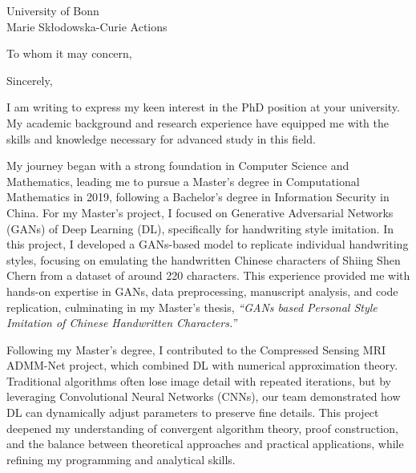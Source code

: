 \documentclass[11pt,a4paper, final]{moderncv}
\newcommand{\spacesubsection}{\vspace{0.2cm}}
\begin{document}
% 
\renewcommand{\refname}{\textbf{Publications}} 
{University of Bonn \\
Marie Skłodowska-Curie Actions}
\date{\today}
\opening{To whom it may concern,}
\closing{Sincerely,}
\makelettertitle
\thispagestyle{empty}
\pagestyle{empty}
I am writing to express my keen interest in the PhD position at your university. 
My academic background and research experience have equipped me with the skills and knowledge 
necessary for advanced study in this field. 

My journey began with a strong foundation in Computer Science and Mathematics, 
leading me to pursue a Master's degree in Computational Mathematics in 2019, 
following a Bachelor's degree in Information Security in China. 
For my Master's project, I focused on Generative Adversarial Networks (GANs) of Deep Learning (DL), 
specifically for handwriting style imitation. 
In this project, I developed a GANs-based model to replicate individual handwriting styles, 
focusing on emulating the handwritten Chinese characters of Shiing Shen Chern from a dataset of around 220 characters. 
This experience provided me with hands-on expertise in GANs, 
data preprocessing, manuscript analysis, and code replication, 
culminating in my Master's thesis, \emph{``GANs based Personal Style Imitation of Chinese Handwritten Characters.''}

Following my Master's degree, 
I contributed to the Compressed Sensing MRI ADMM-Net project, 
which combined DL with numerical approximation theory. 
Traditional algorithms often lose image detail with repeated iterations, 
but by leveraging Convolutional Neural Networks (CNNs), 
our team demonstrated how DL can dynamically adjust parameters to preserve fine details. 
This project deepened my understanding of convergent algorithm theory, proof construction, 
and the balance between theoretical approaches and practical applications, 
while refining my programming and analytical skills.
\end{document}
